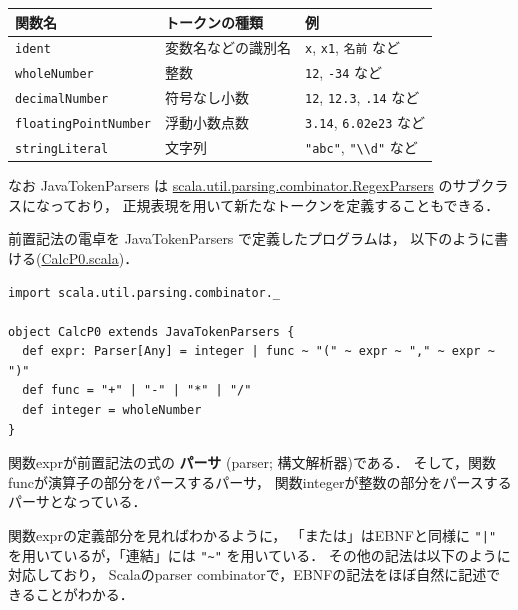 \documentclass[a4j]{jsarticle}
\begin{document}
\begin{center}
\begin{tabular}{lll}
\hline
 関数名                        &  トークンの種類      &  例                                                                 \\
\hline
 \texttt{ident}                &  変数名などの識別名  &  \texttt{x}, \texttt{x1}, \texttt{名前} など                        \\
 \texttt{wholeNumber}          &  整数                &  \texttt{12}, \texttt{-34} など                                     \\
 \texttt{decimalNumber}        &  符号なし小数        &  \texttt{12}, \texttt{12.3}, \texttt{.14} など                      \\
 \texttt{floatingPointNumber}  &  浮動小数点数        &  \texttt{3.14}, \texttt{6.02e23} など                               \\
 \texttt{stringLiteral}        &  文字列              &  \texttt{"abc"}, \texttt{"\textbackslash{}\textbackslash{}d"} など  \\
\hline
\end{tabular}
\end{center}



なお JavaTokenParsers は \href{http://www.scala-lang.org/api/current/scala-parser-combinators/scala/util/parsing/combinator/RegexParsers.html}{scala.util.parsing.combinator.RegexParsers} のサブクラスになっており，
正規表現を用いて新たなトークンを定義することもできる．

前置記法の電卓を JavaTokenParsers で定義したプログラムは，
以下のように書ける(\href{file:///home/tamura/lect2/ProLang/2018/org/prog/parser/CalcP0.scala}{CalcP0.scala})．


\begin{verbatim}
import scala.util.parsing.combinator._

object CalcP0 extends JavaTokenParsers {
  def expr: Parser[Any] = integer | func ~ "(" ~ expr ~ "," ~ expr ~ ")"
  def func = "+" | "-" | "*" | "/"
  def integer = wholeNumber
}
\end{verbatim}

関数exprが前置記法の式の \textbf{パーサ} (parser; 構文解析器)である．
そして，関数funcが演算子の部分をパースするパーサ，
関数integerが整数の部分をパースするパーサとなっている．

関数exprの定義部分を見ればわかるように，
「または」はEBNFと同様に \texttt{"|"} を用いているが，「連結」には \texttt{"\textasciitilde{}"} を用いている．
その他の記法は以下のように対応しており，
Scalaのparser combinatorで，EBNFの記法をほぼ自然に記述できることがわかる．
\end{document}
